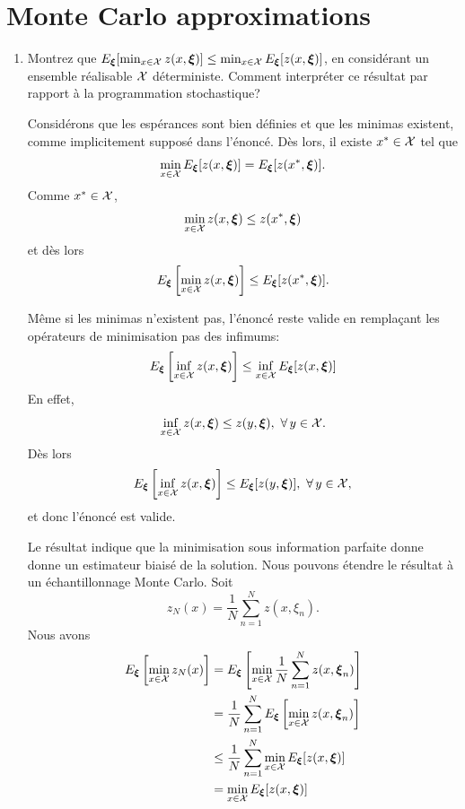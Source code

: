 \chapter{Monte Carlo approximations}

\begin{enumerate}
\item
\begin{exercise}
Montrez que $E_{\boldsymbol{\xi}}[ \min_{x \in \mathcal{X}} z(x,\boldsymbol{\xi}) ] \leq \min_{x \in \mathcal{X}} E_{\boldsymbol{\xi}}[ z(x,\boldsymbol{\xi}) ]$, en considérant un ensemble réalisable $\mathcal{X}$ déterministe.
Comment interpréter ce résultat par rapport à la programmation stochastique?
\end{exercise}

Considérons que les espérances sont bien définies et que les minimas existent, comme implicitement supposé dans l'énoncé.
Dès lors, il existe $x^* \in \mathcal{X}$ tel que
$$
\min_{x \in \mathcal{X}} E_{\boldsymbol{\xi}}[ z(x,\boldsymbol{\xi}) ] = E_{\boldsymbol{\xi}}[ z(x^*,\boldsymbol{\xi}) ].
$$
Comme $x^* \in \mathcal{X}$,
$$
\min_{x \in \mathcal{X}} z(x,\boldsymbol{\xi}) \leq z(x^*,\boldsymbol{\xi})
$$
et dès lors
$$
E_{\boldsymbol{\xi}} \left[\min_{x \in \mathcal{X}} z(x,\boldsymbol{\xi})\right] \leq E_{\boldsymbol{\xi}} [z(x^*,\boldsymbol{\xi})].
$$

Même si les minimas n'existent pas, l'énoncé reste valide en remplaçant les opérateurs de minimisation pas des infimums:
$$
E_{\boldsymbol{\xi}}\left[ \inf_{x \in \mathcal{X}} z(x,\boldsymbol{\xi}) \right] \leq \inf_{x \in \mathcal{X}} E_{\boldsymbol{\xi}}[ z(x,\boldsymbol{\xi}) ]
$$
En effet, 
$$
\inf_{x \in \cX} z(x,\bxi) \leq z(y,\bxi),\ \forall\, y \in \cX.
$$
Dès lors
$$
E_{\boldsymbol{\xi}}\left[ \inf_{x \in \mathcal{X}} z(x,\boldsymbol{\xi}) \right] \leq E_{\boldsymbol{\xi}} [ z(y,\boldsymbol{\xi}) ],\ \forall\, y \in \mathcal{X},
$$
et donc l'énoncé est valide.

Le résultat indique que la minimisation sous information parfaite donne donne un estimateur biaisé de la solution.
Nous pouvons étendre le résultat à un échantillonnage Monte Carlo.
Soit
$$
z_N(x) = \frac{1}{N} \sum_{n = 1}^{N} z(x,\xi_n).
$$
Nous avons
\begin{align*}
E_{\boldsymbol{\xi}}\left[ \min_{x \in \mathcal{X}} z_N(x) \right]
& = E_{\boldsymbol{\xi}}\left[ \min_{x \in \mathcal{X}} \frac{1}{N} \sum_{n = 1}^{N} z(x,\boldsymbol{\xi}_n) \right] \\
& = \frac{1}{N} \sum_{n = 1}^{N} E_{\boldsymbol{\xi}}\left[ \min_{x \in \mathcal{X}} z(x,\boldsymbol{\xi}_n) \right] \\
& \leq \frac{1}{N} \sum_{n = 1}^{N} \min_{x \in \mathcal{X}} E_{\boldsymbol{\xi}}[ z(x,\boldsymbol{\xi}) ] \\
& = \min_{x \in \mathcal{X}} E_{\boldsymbol{\xi}}[ z(x,\boldsymbol{\xi}) ]
\end{align*}

\end{enumerate}